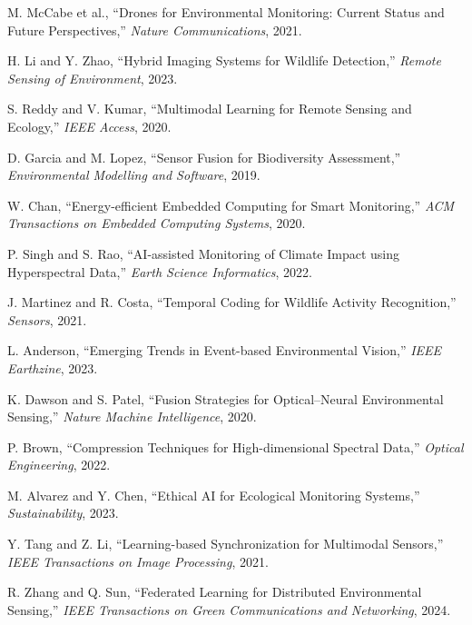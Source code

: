 \documentclass[conference]{IEEEtran}
\begin{document}
\begin{thebibliography}{26}
M. McCabe et al., “Drones for Environmental Monitoring: Current Status and Future Perspectives,” \textit{Nature Communications}, 2021.

H. Li and Y. Zhao, “Hybrid Imaging Systems for Wildlife Detection,” \textit{Remote Sensing of Environment}, 2023.

S. Reddy and V. Kumar, “Multimodal Learning for Remote Sensing and Ecology,” \textit{IEEE Access}, 2020.

D. Garcia and M. Lopez, “Sensor Fusion for Biodiversity Assessment,” \textit{Environmental Modelling and Software}, 2019.

W. Chan, “Energy-efficient Embedded Computing for Smart Monitoring,” \textit{ACM Transactions on Embedded Computing Systems}, 2020.

P. Singh and S. Rao, “AI-assisted Monitoring of Climate Impact using Hyperspectral Data,” \textit{Earth Science Informatics}, 2022.

J. Martinez and R. Costa, “Temporal Coding for Wildlife Activity Recognition,” \textit{Sensors}, 2021.

L. Anderson, “Emerging Trends in Event-based Environmental Vision,” \textit{IEEE Earthzine}, 2023.

K. Dawson and S. Patel, “Fusion Strategies for Optical–Neural Environmental Sensing,” \textit{Nature Machine Intelligence}, 2020.

P. Brown, “Compression Techniques for High-dimensional Spectral Data,” \textit{Optical Engineering}, 2022.

M. Alvarez and Y. Chen, “Ethical AI for Ecological Monitoring Systems,” \textit{Sustainability}, 2023.

Y. Tang and Z. Li, “Learning-based Synchronization for Multimodal Sensors,” \textit{IEEE Transactions on Image Processing}, 2021.

R. Zhang and Q. Sun, “Federated Learning for Distributed Environmental Sensing,” \textit{IEEE Transactions on Green Communications and Networking}, 2024.

\end{thebibliography}
\end{document}
